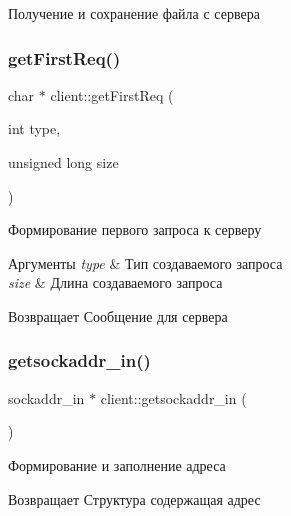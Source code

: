 Получение и сохранение файла с сервера 

\mbox{\label{classclient_a01979f2bcb8145f6686fa4d8742d3cce}} 
\subsubsection{\texorpdfstring{get\+First\+Req()}{getFirstReq()}}
{\footnotesize\ttfamily char $\ast$ client\+::get\+First\+Req (\begin{DoxyParamCaption}\item[{int}]{type,  }\item[{unsigned long}]{size }\end{DoxyParamCaption})\hspace{0.3cm}{\ttfamily [private]}}



Формирование первого запроса к серверу 


\begin{DoxyParams}{Аргументы}
{\em type} & Тип создаваемого запроса \\
\hline
{\em size} & Длина создаваемого запроса \\
\hline
\end{DoxyParams}
\begin{DoxyReturn}{Возвращает}
Сообщение для сервера 
\end{DoxyReturn}
\mbox{\label{classclient_ac001ccb8499fb06c82c9e6f648e092a0}} 
\subsubsection{\texorpdfstring{getsockaddr\+\_\+in()}{getsockaddr\_in()}}
{\footnotesize\ttfamily sockaddr\+\_\+in $\ast$ client\+::getsockaddr\+\_\+in (\begin{DoxyParamCaption}{ }\end{DoxyParamCaption})\hspace{0.3cm}{\ttfamily [private]}}



Формирование и заполнение адреса 

\begin{DoxyReturn}{Возвращает}
Структура содержащая адрес 
\end{DoxyReturn}
\mbox{\label{classclient_a3d5dcc87c7c44d1f334ad39325ce9a08}} 
